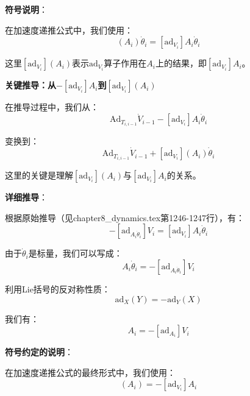 \documentclass[12pt,a4paper]{article}
\begin{document}
\textbf{符号说明}：

在加速度递推公式中，我们使用：
\begin{equation}
[\text{ad}_{V_i}](A_i) \dot{\theta}_i = [\text{ad}_{V_i}] A_i \dot{\theta}_i
\end{equation}

这里$[\text{ad}_{V_i}](A_i)$表示$\text{ad}_{V_i}$算子作用在$A_i$上的结果，即$[\text{ad}_{V_i}] A_i$。

\textbf{关键推导：从$-[\text{ad}_{V_i}] A_i$到$[\text{ad}_{V_i}](A_i)$}

在推导过程中，我们从：
\begin{equation}
\text{Ad}_{T_{i,i-1}} \dot{V}_{i-1} - [\text{ad}_{V_i}] A_i \dot{\theta}_i
\end{equation}

变换到：
\begin{equation}
\text{Ad}_{T_{i,i-1}} \dot{V}_{i-1} + [\text{ad}_{V_i}](A_i) \dot{\theta}_i
\end{equation}

这里的关键是理解$[\text{ad}_{V_i}](A_i)$与$[\text{ad}_{V_i}] A_i$的关系。

\textbf{详细推导}：

根据原始推导（见chapter8\_dynamics.tex第1246-1247行），有：
\begin{equation}
-[\text{ad}_{A_i \dot{\theta}_i}] V_i = [\text{ad}_{V_i}] A_i \dot{\theta}_i
\label{eq:original_relation}
\end{equation}

由于$\dot{\theta}_i$是标量，我们可以写成：
\begin{equation}
[\text{ad}_{V_i}] A_i \dot{\theta}_i = -[\text{ad}_{A_i \dot{\theta}_i}] V_i
\end{equation}

利用Lie括号的反对称性质：
\begin{equation}
\text{ad}_X(Y) = -\text{ad}_Y(X)
\end{equation}

我们有：
\begin{equation}
[\text{ad}_{V_i}] A_i = -[\text{ad}_{A_i}] V_i
\label{eq:antisymmetric}
\end{equation}

\textbf{符号约定的说明}：

在加速度递推公式的最终形式中，我们使用：
\begin{equation}
[\text{ad}_{V_i}](A_i) = -[\text{ad}_{V_i}] A_i
\label{eq:sign_convention}
\end{equation}
\end{document}
